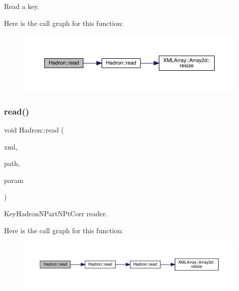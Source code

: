 Read a key. 

Here is the call graph for this function\+:
\nopagebreak
\begin{figure}[H]
\begin{center}
\leavevmode
\includegraphics[width=350pt]{d1/daf/namespaceHadron_adde6149254919751c9f0e1b2b12c4d17_cgraph}
\end{center}
\end{figure}
\mbox{\label{namespaceHadron_a85b27e940a60880e6f98fb6a939d96c2}} 
\subsubsection{\texorpdfstring{read()}{read()}\hspace{0.1cm}{\footnotesize\ttfamily [23/94]}}
{\footnotesize\ttfamily void Hadron\+::read (\begin{DoxyParamCaption}\item[{\mbox{\hyperlink{classADATXML_1_1XMLReader}{X\+M\+L\+Reader}} \&}]{xml,  }\item[{const std\+::string \&}]{path,  }\item[{\mbox{\hyperlink{structHadron_1_1KeyHadronNPartNPtCorr__t}{Key\+Hadron\+N\+Part\+N\+Pt\+Corr\+\_\+t}} \&}]{param }\end{DoxyParamCaption})}



Key\+Hadron\+N\+Part\+N\+Pt\+Corr reader. 

Here is the call graph for this function\+:
\nopagebreak
\begin{figure}[H]
\begin{center}
\leavevmode
\includegraphics[width=350pt]{d1/daf/namespaceHadron_a85b27e940a60880e6f98fb6a939d96c2_cgraph}
\end{center}
\end{figure}
\mbox{\label{namespaceHadron_ac7fbe05fdb59de181eed9428364667e3}} 
